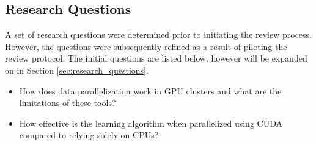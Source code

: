 \subsection{Research Questions}
\label{sec:initial_research_questions}
A set of research questions were determined prior to initiating the review process. However, the questions
were subsequently refined as a result of piloting the review protocol. The initial questions are listed below,
however will be expanded on in Section \ref{sec:research_questions}.

\begin{itemize}
	\item How does data parallelization work in GPU clusters and what are the limitations of these tools?
	\item How effective is the learning algorithm when parallelized using CUDA compared to relying solely on CPUs?
\end{itemize}





